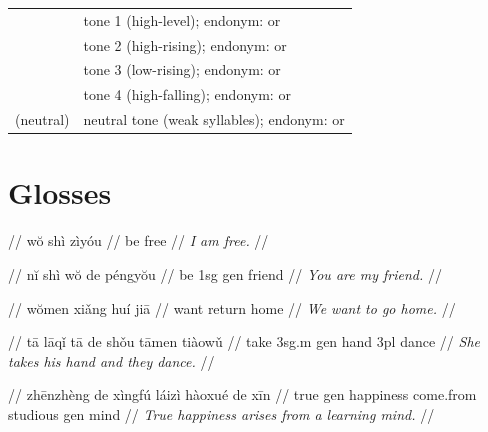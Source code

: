 \documentclass{article}
\begin{document}
\begin{xltabular}{\textwidth}{lL}
   & tone 1 (high-level); endonym:  or  \\
   & tone 2 (high-rising); endonym:  or  \\
   & tone 3 (low-rising); endonym:  or  \\
   & tone 4 (high-falling); endonym:  or  \\
  (neutral) & neutral tone (weak syllables); endonym:  or  \\
\end{xltabular}

\newpage\section{Glosses}

\ex
\begingl
\gla {}   //
\glb w\u{o} sh\`{i} z\`{i}y\'{o}u //
 be free //
\glft \textit{I am free.} //
\endgl
\xe

\ex
\begingl
\gla {}     //
\glb n\u{i} sh\`{i} w\u{o} de p\'{e}ngy\u{o}u //
 be {\sc 1sg} {\sc gen} friend //
\glft \textit{You are my friend.} //
\endgl
\xe

\ex
\begingl
\gla {}    //
\glb w\u{o}men xi\v{a}ng hu\'{i} ji\=a //
 want return home //
\glft \textit{We want to go home.} //
\endgl
\xe

\ex
\begingl
\gla {}       //
\glb t\=a l\=aq\v{i} t\=a de sh\v{o}u t\=amen ti\`{a}ow\v{u} //
 take {\sc 3sg.m} {\sc gen} hand {\sc 3pl} dance //
\glft \textit{She takes his hand and they dance.} //
\endgl
\xe

\ex
\begingl
\gla {}       //
\glb zh\=enzh\`{e}ng de x\`{i}ngf\'{u} l\'{a}iz\`{i} h\`{a}oxu\'{e} de x\=in //
\glc true {\sc gen} happiness come.from studious {\sc gen} mind //
\glft \textit{True happiness arises from a learning mind.} //
\endgl
\xe
\end{document}
